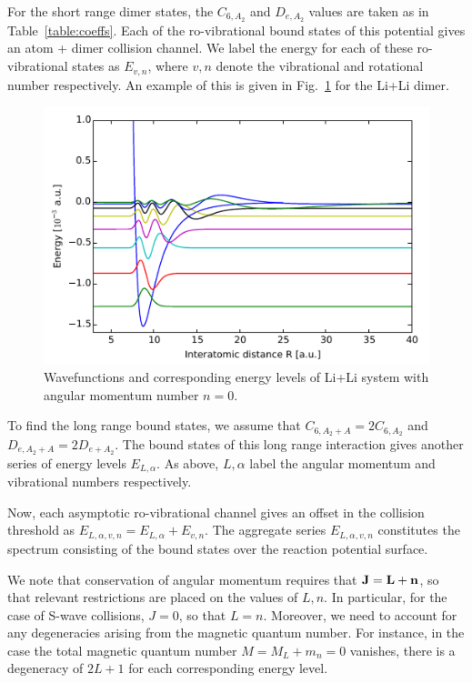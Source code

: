 \documentclass[%
 reprint,
 amsmath,amssymb,
 aps,
 nofootinbib
]{revtex4-1}
\begin{document}
For the short range dimer states, the $C_{6,A_2}$ and $D_{e,A_2}$ values are taken as in Table~\ref{table:coeffs}. Each of the ro-vibrational bound states of this potential gives an atom + dimer collision channel. We label the energy for each of these ro-vibrational states as $E_{v,n}$, where $v,n$ denote the vibrational and rotational number respectively. An example of this is given in Fig.~\ref{fig:li_dimer_wavefunctions} for the Li+Li dimer.

\begin{figure}
\includegraphics{figures/li_li_n0_wavefunctions}
\caption{\label{fig:li_dimer_wavefunctions}Wavefunctions and corresponding energy levels of Li+Li system with angular momentum number $n=0$.}
\end{figure}

To find the long range bound states, we assume that $C_{6,A_2+A} = 2C_{6,A_2}$ and $D_{e,A_2+A}=2D_{e+A_2}$. The bound states of this long range interaction gives another series of energy levels $E_{L,\alpha}$. As above, $L,\alpha$ label the angular momentum and vibrational numbers respectively. 

Now, each asymptotic ro-vibrational channel gives an offset in the collision threshold as $E_{L,\alpha,v,n} = E_{L,\alpha}+E_{v,n}$. The aggregate series $E_{L,\alpha,v,n}$ constitutes the spectrum consisting of the bound states over the reaction potential surface.

We note that conservation of angular momentum requires that $\mathbf{J}=\mathbf{L}+\mathbf{n}$, so that relevant restrictions are placed on the values of $L,n$. In particular, for the case of S-wave collisions, $J=0$, so that $L=n$. Moreover, we need to account for any degeneracies arising from the magnetic quantum number. For instance, in the case the total magnetic quantum number $M=M_L+m_n=0$ vanishes, there is a degeneracy of $2L+1$ for each corresponding energy level.
\end{document}
